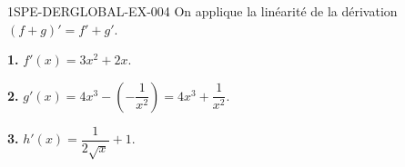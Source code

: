 \begin{corrige}{1SPE-DERGLOBAL-EX-004}
On applique la linéarité de la dérivation $(f+g)' = f' + g'$.

\textbf{1.} $f'(x) = 3x^2 + 2x$.

\textbf{2.} $g'(x) = 4x^3 - \left(-\dfrac{1}{x^2}\right) = 4x^3 + \dfrac{1}{x^2}$.

\textbf{3.} $h'(x) = \dfrac{1}{2\sqrt{x}} + 1$.
\end{corrige}
